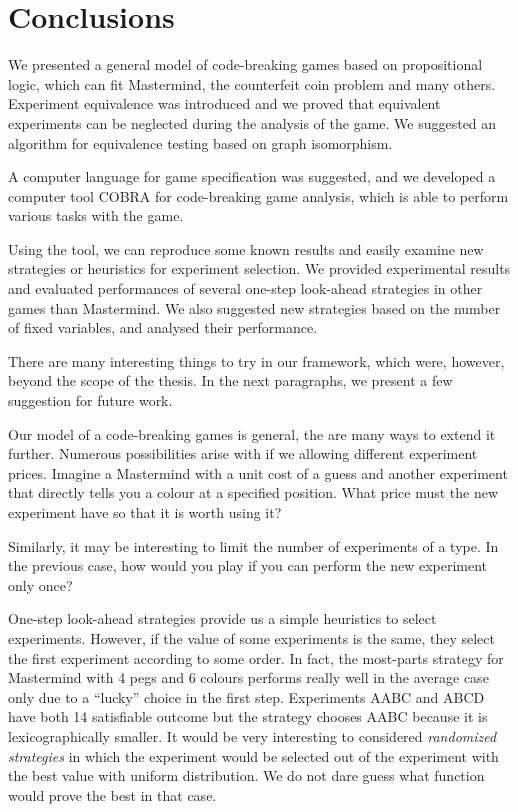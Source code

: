 \chapter{Conclusions}

We presented a general model of code-breaking games based on propositional logic,
  which can fit Mastermind, the counterfeit coin problem and many others.
Experiment equivalence was introduced and we proved that
  equivalent experiments can be neglected during the analysis of the game.
We suggested an algorithm for equivalence testing based on graph isomorphism.

A computer language for game specification was suggested,
  and we developed a computer tool COBRA for code-breaking game analysis,
  which is able to perform various tasks with the game.

Using the tool, we can reproduce some known results and easily examine
  new strategies or heuristics for experiment selection.
We provided experimental results and evaluated performances of
  several one-step look-ahead strategies in other games than Mastermind.
We also suggested new strategies based on the number of fixed variables,
  and analysed their performance.

There are many interesting things to try in our framework,
  which were, however, beyond the scope of the thesis.
In the next paragraphs, we present a few suggestion for future work.

Our model of a code-breaking games is general,
  the are many ways to extend it further.
Numerous possibilities arise with if we allowing different experiment prices.
Imagine a Mastermind with a unit cost of a guess and another
  experiment that directly tells
  you a colour at a specified position.
What price must the new experiment have so that
  it is worth using it?

Similarly, it may be interesting to limit
  the number of experiments of a type.
In the previous case, how would you play if you can
  perform the new experiment only once?

One-step look-ahead strategies provide us a simple heuristics to select experiments.
However, if the value of some experiments is the same,
  they select the first experiment according to some order.
In fact, the most-parts strategy for Mastermind with 4 pegs and 6 colours
  performs really well in the average case
  only due to a ``lucky'' choice in the first step.
Experiments AABC and ABCD have both 14 satisfiable outcome
  but the strategy chooses AABC because it is lexicographically smaller.
It would be very interesting to considered \emph{randomized strategies}
  in which the experiment would be selected out of the experiment
  with the best value with uniform distribution.
We do not dare guess what function would prove the best in that case.

